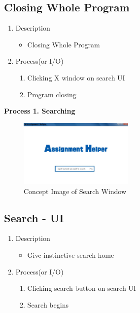 \documentclass[conference]{IEEEtran}
\begin{document}
\textit{}

\subsection{Closing Whole Program}
\begin{enumerate}
  \item Description
  \begin{itemize}
    \item Closing Whole Program
  \end{itemize}
  \item Process(or I/O)
  \begin{enumerate}
    \item Clicking X window on search UI
    \item Program closing
  \end{enumerate}
\end{enumerate}
\textit{}


%
\textbf{Process 1. Searching}


\textit{}
\begin{figure}[ht]
\centering
\includegraphics[width=0.5\textwidth]{./figures/UI_main.jpg}
\caption{Concept Image of Search Window}
\label{fig_concept_main}
\end{figure}


\subsection{Search - UI}
\begin{enumerate}
\item Description
\begin{itemize}
   \item Give instinctive search home
\end{itemize}
\item Process(or I/O)
  \begin{enumerate}
     \item Clicking search button on search UI
     \item Search begins
  \end{enumerate}
\end{enumerate}
\textit{}
\end{document}

